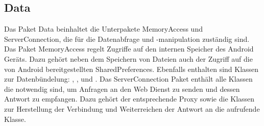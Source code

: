 \label{app:module:data}\subsection{Data}
Das Paket Data beinhaltet die Unterpakete MemoryAccess und ServerConnection, die für die Datenabfrage und -manipulation zuständig sind.\newline
Das Paket MemoryAccess regelt Zugriffe auf den internen Speicher des Android Geräts. Dazu gehört neben dem Speichern von Dateien auch der Zugriff auf die von Android bereitgestellten SharedPreferences. Ebenfalls enthalten sind Klassen zur Datenbündelung: , ,  und .\newline
Das ServerConnection Paket enthält alle Klassen die notwendig sind, um Anfragen an den Web Dienst zu senden und dessen Antwort zu empfangen. Dazu gehört der entsprechende Proxy sowie die Klassen zur Herstellung der Verbindung und Weiterreichen der Antwort an die aufrufende Klasse.